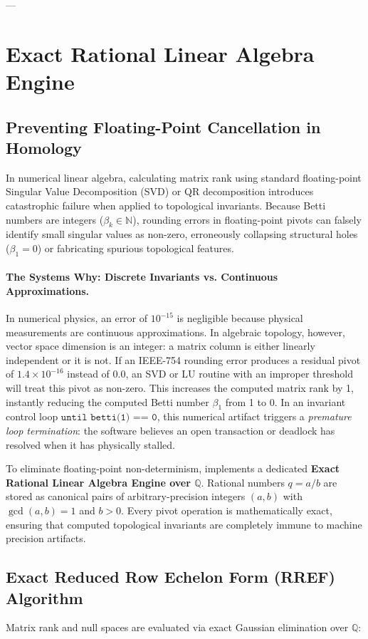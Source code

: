 ---

\section{Exact Rational Linear Algebra Engine}
\label{sec:exact_linear_algebra}

\subsection{Preventing Floating-Point Cancellation in Homology}
In numerical linear algebra, calculating matrix rank using standard floating-point Singular Value Decomposition (SVD) or QR decomposition introduces catastrophic failure when applied to topological invariants. Because Betti numbers are integers ($\beta_k \in \mathbb{N}$), rounding errors in floating-point pivots can falsely identify small singular values as non-zero, erroneously collapsing structural holes ($\beta_1 = 0$) or fabricating spurious topological features.

\paragraph{The Systems Why: Discrete Invariants vs. Continuous Approximations.}
In numerical physics, an error of $10^{-15}$ is negligible because physical measurements are continuous approximations. In algebraic topology, however, vector space dimension is an integer: a matrix column is either linearly independent or it is not. If an IEEE-754 rounding error produces a residual pivot of $1.4 \times 10^{-16}$ instead of $0.0$, an SVD or LU routine with an improper threshold will treat this pivot as non-zero. This increases the computed matrix rank by 1, instantly reducing the computed Betti number $\beta_1$ from 1 to 0. In an invariant control loop $\texttt{until betti(1) == 0}$, this numerical artifact triggers a \textit{premature loop termination}: the software believes an open transaction or deadlock has resolved when it has physically stalled.

To eliminate floating-point non-determinism, \ToposLang{} implements a dedicated \textbf{Exact Rational Linear Algebra Engine over $\mathbb{Q}$}. Rational numbers $q = a/b$ are stored as canonical pairs of arbitrary-precision integers $(a, b)$ with $\gcd(a, b) = 1$ and $b > 0$. Every pivot operation is mathematically exact, ensuring that computed topological invariants are completely immune to machine precision artifacts.

\subsection{Exact Reduced Row Echelon Form (RREF) Algorithm}
Matrix rank and null spaces are evaluated via exact Gaussian elimination over $\mathbb{Q}$:

